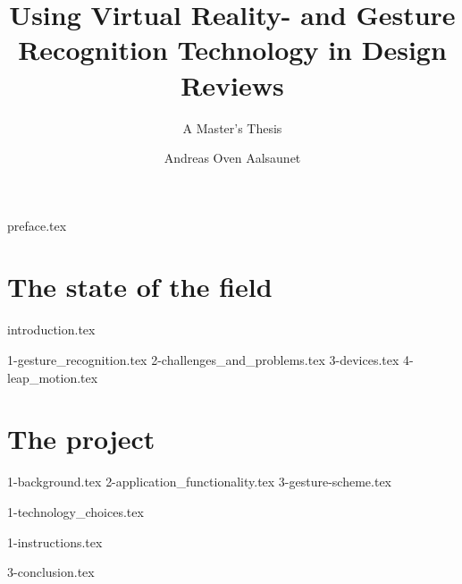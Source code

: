 \documentclass[UKenglish]{ifimaster}
\title{Using Virtual Reality- and Gesture Recognition Technology in Design Reviews}
\subtitle{A Master's Thesis}
\author{Andreas Oven Aalsaunet}
\begin{document}
\duoforside[dept={Department of Informatics}, program={Programming and Networks}, long]                                        

\frontmatter{}                 
\tableofcontents{}
\listoffigures{}
\listoftables{}

{preface.tex}

\mainmatter{}
\part{The state of the field}  
{introduction.tex}

{1-gesture_recognition.tex}
{2-challenges_and_problems.tex}
{3-devices.tex}
{4-leap_motion.tex}



\part{The project} 

{1-background.tex}
{2-application_functionality.tex}
{3-gesture-scheme.tex}

{1-technology_choices.tex}

{1-instructions.tex}

{3-conclusion.tex}

\backmatter{}


\end{document}
